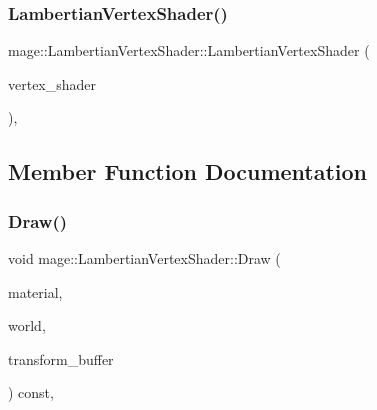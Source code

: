 \hypertarget{classmage_1_1_lambertian_vertex_shader_a1202feaaeb64148207e2fb10290a09c8}{}\label{classmage_1_1_lambertian_vertex_shader_a1202feaaeb64148207e2fb10290a09c8} 
\subsubsection{\texorpdfstring{Lambertian\+Vertex\+Shader()}{LambertianVertexShader()}\hspace{0.1cm}{\footnotesize\ttfamily [3/3]}}
{\footnotesize\ttfamily mage\+::\+Lambertian\+Vertex\+Shader\+::\+Lambertian\+Vertex\+Shader (\begin{DoxyParamCaption}\item[{\hyperlink{classmage_1_1_lambertian_vertex_shader}{Lambertian\+Vertex\+Shader} \&\&}]{vertex\+\_\+shader }\end{DoxyParamCaption})\hspace{0.3cm}{\ttfamily [private]}, {\ttfamily [delete]}}



\subsection{Member Function Documentation}
\hypertarget{classmage_1_1_lambertian_vertex_shader_a754fa599b43ba29b83b4b255f140c6de}{}\label{classmage_1_1_lambertian_vertex_shader_a754fa599b43ba29b83b4b255f140c6de} 
\subsubsection{\texorpdfstring{Draw()}{Draw()}}
{\footnotesize\ttfamily void mage\+::\+Lambertian\+Vertex\+Shader\+::\+Draw (\begin{DoxyParamCaption}\item[{const \hyperlink{structmage_1_1_material}{Material} \&}]{material,  }\item[{const \hyperlink{classmage_1_1_world}{World} \&}]{world,  }\item[{const \hyperlink{structmage_1_1_transform_buffer}{Transform\+Buffer} \&}]{transform\+\_\+buffer }\end{DoxyParamCaption}) const\hspace{0.3cm}{\ttfamily [override]}, {\ttfamily [virtual]}}




